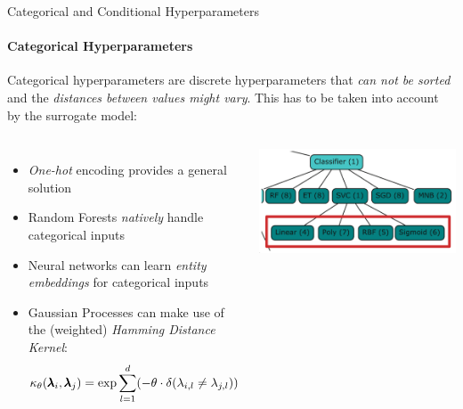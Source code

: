 \begin{frame}[c]{Categorical and Conditional Hyperparameters}
\framesubtitle{Categorical Hyperparameters}
Categorical hyperparameters are discrete hyperparameters that \emph{can not be sorted} and the \emph{distances between values might vary}. This has to be taken into account by the surrogate model:
%
\pause
%
\begin{columns}[T]
\begin{itemize}
    \item <+-> \emph{One-hot} encoding provides a general solution
    \item <+-> Random Forests \emph{natively} handle categorical inputs
    \item <+-> Neural networks can learn \emph{entity embeddings} for categorical inputs 
    \item <+-> Gaussian Processes can make use of the (weighted) \emph{Hamming Distance Kernel}: 
\begin{equation*}
    \kappa_{\theta}(\pmb{\lambda}_i, \pmb{\lambda}_j) = \exp{\sum_{l=1}^d (-\theta \cdot \delta(\lambda_{i,l} \neq \lambda_{j,l}))}
\end{equation*}
\end{itemize}
%
\vspace{0.5cm}
\includegraphics[width=1\textwidth]{w06_hpo_bo/images/categ_cond_params/categorical.png}
%
\end{columns}
\end{frame}
